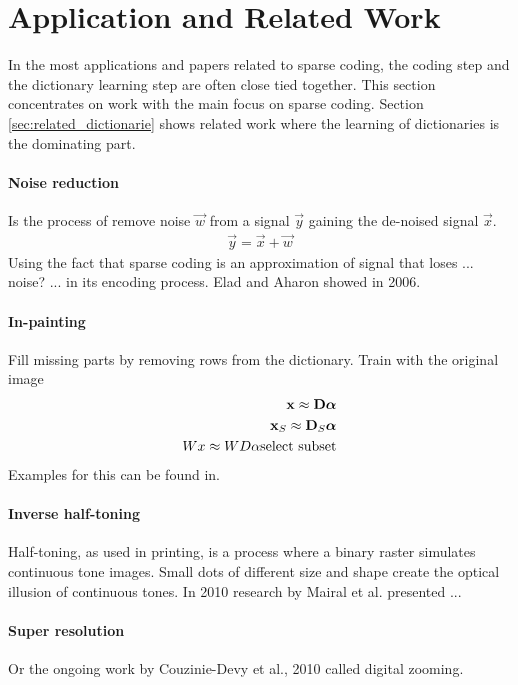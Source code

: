 \section{Application and Related Work}
In the most applications and papers related to sparse coding, the coding
step and the dictionary learning step are often close tied together. This
section concentrates on work with the main focus on sparse coding. Section
\ref{sec:related_dictionarie} shows related work where the learning of
dictionaries is the dominating part.

\paragraph{Noise reduction}
Is the process of remove noise $\vec{w}$ from a signal $\vec{y}$ gaining the
de-noised signal $\vec{x}$.
\begin{align*}
\vec{y} = \vec{x} + \vec{w}
\end{align*}
Using the fact that sparse coding is an approximation of signal that loses ...
noise? ... in its encoding process. 
Elad and Aharon showed in 2006\cite{Elad2006}.

\paragraph{In-painting}
Fill missing parts by removing rows from the dictionary.
Train with the original image
\begin{align*}
\boldsymbol{\mathrm{x}} \approx \boldsymbol{\mathrm{D}}\boldsymbol{\mathrm{\alpha}}\\
\boldsymbol{\mathrm{x}}_S \approx \boldsymbol{\mathrm{D}}_S\boldsymbol{\mathrm{\alpha}}\\
Wx \approx WD\alpha\text{select subset}\\
\end{align*}
Examples for this can be found in\cite{mairal08sparse}.


\paragraph{Inverse half-toning} Half-toning, as used in printing, is a process
where a binary raster simulates continuous tone images. Small dots of different
size and shape create the optical illusion of continuous tones. In 2010 research
by Mairal et al.\cite{Mairal2010b} presented ...


\paragraph{Super resolution} \cite{Wright2008,Yang2010, Yang2010}  
Or the ongoing work by Couzinie-Devy et al., 2010 called digital zooming.


